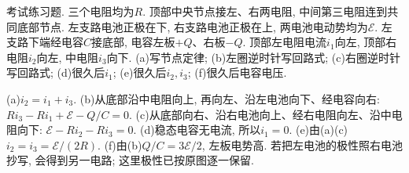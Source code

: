 \begin{exercise}
考试练习题. 三个电阻均为$R$. 顶部中央节点接左、右两电阻, 中间第三电阻连到共同底部节点. 左支路电池正极在下, 右支路电池正极在上, 两电池电动势均为$\mathcal E$. 左支路下端经电容$C$接底部, 电容左板$+Q$、右板$-Q$. 顶部左电阻电流$i_1$向左, 顶部右电阻$i_2$向左, 中电阻$i_3$向下.
(a)写节点定律; (b)左圈逆时针写回路式; (c)右圈逆时针写回路式; (d)很久后$i_1$; (e)很久后$i_2,i_3$; (f)很久后电容电压.
\end{exercise}
\begin{solution}
(a)$i_2=i_1+i_3$.
(b)从底部沿中电阻向上, 再向左、沿左电池向下、经电容向右: $Ri_3-Ri_1+\mathcal E-Q/C=0$.
(c)从底部向右、沿右电池向上、经右电阻向左、沿中电阻向下: $\mathcal E-Ri_2-Ri_3=0$.
(d)稳态电容无电流, 所以$i_1=0$.
(e)由(a)(c)$i_2=i_3=\mathcal E/(2R)$.
(f)由(b)$Q/C=3\mathcal E/2$, 左板电势高. 若把左电池的极性照右电池抄写, 会得到另一电路; 这里极性已按原图逐一保留.
\end{solution}
